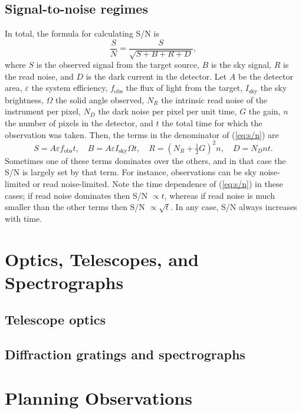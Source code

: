 \subsection{Signal-to-noise regimes}
In total, the formula for calculating S/N is
\begin{equation} \label{eq:s/n}
    \frac{S}{N} = \frac{S}{\sqrt{S + B + R + D}},
\end{equation}
where $S$ is the observed signal from the target source, $B$ is the sky signal, $R$ is the read noise, and $D$ is the dark current in the detector. Let $A$ be the detector area, $\varepsilon$ the system efficiency, $f_\text{obs}$ the flux of light from the target, $I_\text{sky}$ the sky brightness, $\Omega$ the solid angle observed, $N_R$ the intrinsic read noise of the instrument per pixel, $N_D$ the dark noise per pixel per unit time, $G$ the gain, $n$ the number of pixels in the detector, and $t$ the total time for which the observation was taken. Then, the terms in the denominator of (\ref{eq:s/n}) are
\begin{equation}
    S = A \varepsilon f_\text{obs} t, \quad B = A \varepsilon I_\text{sky} \Omega t, \quad R = \left ( N_R + \tfrac{1}{2} G \right )^2 n, \quad D = N_D n t.
\end{equation}
Sometimes one of these terms dominates over the others, and in that case the S/N is largely set by that term. For instance, observations can be sky noise-limited or read noise-limited. Note the time dependence of (\ref{eq:s/n}) in these cases; if read noise dominates then S/N $\propto t$, whereas if read noise is much smaller than the other terms then S/N $\propto \sqrt{t}$. In any case, S/N always increases with time.


\section{Optics, Telescopes, and Spectrographs}
\subsection{Telescope optics}

\subsection{Diffraction gratings and spectrographs}


\section{Planning Observations}

